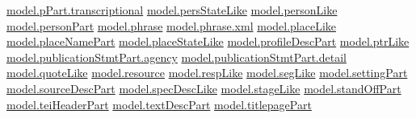 \begin{description}
\begin{itemize}
\hyperref[TEI.model.pPart.transcriptional]{model.pPart.transcriptional} \hyperref[TEI.model.persStateLike]{model.persStateLike} \hyperref[TEI.model.personLike]{model.personLike} \hyperref[TEI.model.personPart]{model.personPart} \hyperref[TEI.model.phrase]{model.phrase} \hyperref[TEI.model.phrase.xml]{model.phrase.xml} \hyperref[TEI.model.placeLike]{model.placeLike} \hyperref[TEI.model.placeNamePart]{model.placeNamePart} \hyperref[TEI.model.placeStateLike]{model.placeStateLike} \hyperref[TEI.model.profileDescPart]{model.profileDescPart} \hyperref[TEI.model.ptrLike]{model.ptrLike} \hyperref[TEI.model.publicationStmtPart.agency]{model.publicationStmtPart.agency} \hyperref[TEI.model.publicationStmtPart.detail]{model.publicationStmtPart.detail} \hyperref[TEI.model.quoteLike]{model.quoteLike} \hyperref[TEI.model.resource]{model.resource} \hyperref[TEI.model.respLike]{model.respLike} \hyperref[TEI.model.segLike]{model.segLike} \hyperref[TEI.model.settingPart]{model.settingPart} \hyperref[TEI.model.sourceDescPart]{model.sourceDescPart} \hyperref[TEI.model.specDescLike]{model.specDescLike} \hyperref[TEI.model.stageLike]{model.stageLike} \hyperref[TEI.model.standOffPart]{model.standOffPart} \hyperref[TEI.model.teiHeaderPart]{model.teiHeaderPart} \hyperref[TEI.model.textDescPart]{model.textDescPart} \hyperref[TEI.model.titlepagePart]{model.titlepagePart}

\end{itemize}
\end{description}
